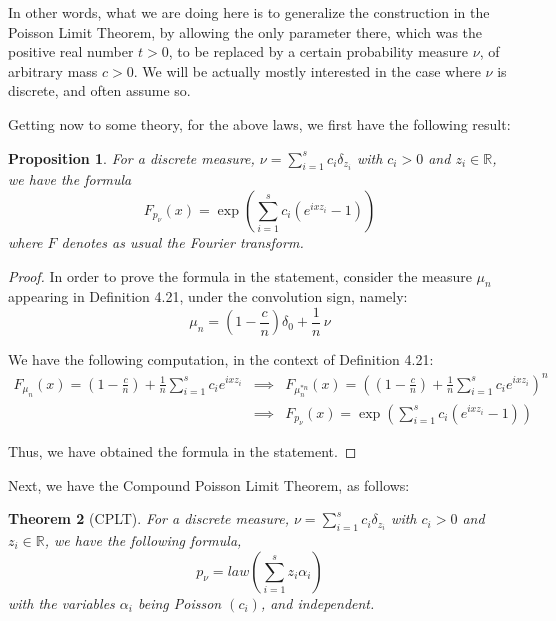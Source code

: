 \documentclass[12pt]{amsbook}
\newtheorem{theorem}{Theorem}[chapter]
\newtheorem{proposition}[theorem]{Proposition}
\begin{document}
In other words, what we are doing here is to generalize the construction in the Poisson Limit Theorem, by allowing the only parameter there, which was the positive real number $t>0$, to be replaced by a certain probability measure $\nu$, of arbitrary mass $c>0$. We will be actually mostly interested in the case where $\nu$ is discrete, and often assume so.

\bigskip

Getting now to some theory, for the above laws, we first have the following result:


\begin{proposition}
For a discrete measure, $\nu=\sum_{i=1}^sc_i\delta_{z_i}$ with $c_i>0$ and $z_i\in\mathbb R$, we have the formula
$$F_{p_\nu}(x)=\exp\left(\sum_{i=1}^sc_i(e^{ixz_i}-1)\right)$$
where $F$ denotes as usual the Fourier transform.
\end{proposition}

\begin{proof}
In order to prove the formula in the statement, consider the measure $\mu_n$ appearing in Definition 4.21, under the convolution sign, namely:
$$\mu_n=\left(1-\frac{c}{n}\right)\delta_0+\frac{1}{n}\,\nu$$

We have the following computation, in the context of Definition 4.21:
\begin{eqnarray*}
F_{\mu_n}(x)=\left(1-\frac{c}{n}\right)+\frac{1}{n}\sum_{i=1}^sc_ie^{ixz_i}
&\implies&F_{\mu_n^{*n}}(x)=\left(\left(1-\frac{c}{n}\right)+\frac{1}{n}\sum_{i=1}^sc_ie^{ixz_i}\right)^n\\
&\implies&F_{p_\nu}(x)=\exp\left(\sum_{i=1}^sc_i(e^{ixz_i}-1)\right)
\end{eqnarray*}

Thus, we have obtained the formula in the statement.
\end{proof}

Next, we have the Compound Poisson Limit Theorem, as follows:


\begin{theorem}[CPLT]
For a discrete measure, $\nu=\sum_{i=1}^sc_i\delta_{z_i}$ with $c_i>0$ and $z_i\in\mathbb R$, we have the following formula,
$$p_\nu=law\left(\sum_{i=1}^sz_i\alpha_i\right)$$
with the variables $\alpha_i$ being Poisson $(c_i)$, and independent.
\end{theorem}
\end{document}
